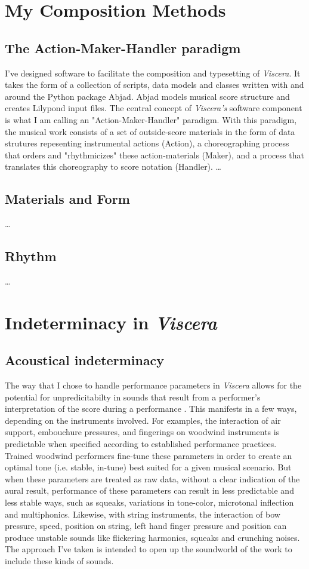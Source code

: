 \documentclass[11pt]{article}
\begin{document}
\section{My Composition Methods}
\subsection{The Action-Maker-Handler paradigm}
I've designed software to facilitate the composition and typesetting of \textit {Viscera}. It takes the form of a collection of scripts, data models and classes written with and around the Python package Abjad. Abjad models musical score structure and creates Lilypond input files. The central concept of \textit {Viscera's} software component is what I am calling an "Action-Maker-Handler" paradigm. With this paradigm, the musical work consists of a set of outside-score materials in the form of data strutures repesenting instrumental actions (Action), a choreographing process that orders and "rhythmicizes" these action-materials (Maker), and a process that translates this choreography to score notation (Handler).
\ldots

\subsection{Materials and Form}
\ldots

\subsection{Rhythm}
\ldots

\section{Indeterminacy in \textit{Viscera}}
\subsection{Acoustical indeterminacy}
The way that I chose to handle performance parameters in \textit {Viscera} allows for the potential for unpredicitabilty in sounds that result from a performer's interpretation of the score during a performance . This manifests in a few ways, depending on the instruments involved.  For examples, the interaction of air support, embouchure pressures, and fingerings on woodwind instruments is predictable when specified according to established performance practices. Trained woodwind performers fine-tune these parameters in order to create an optimal tone (i.e. stable, in-tune) best suited for a given musical scenario. But when these parameters are treated as raw data, without a clear indication of the aural result, performance of these parameters can result in less predictable and less stable ways, such as squeaks, variations in tone-color, microtonal inflection and multiphonics. Likewise, with string instruments, the interaction of bow pressure, speed, position on string, left hand finger pressure and position can produce unstable sounds like flickering harmonics, squeaks and crunching noises. The approach I've taken is intended to open up the soundworld of the work to include these kinds of sounds.
\end{document}

